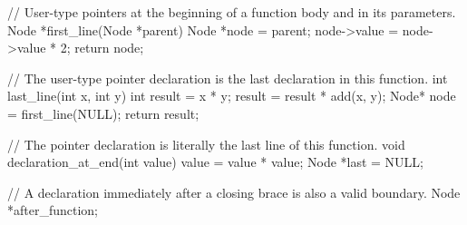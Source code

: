 \documentclass{article}
\begin{document}
\begin{Piton}[language=C,splittable-on-empty-lines]
// User-type pointers at the beginning of a function body and in its parameters.
Node *first_line(Node *parent) {
  Node *node = parent;
  node->value = node->value * 2;
  return node;
}

// The user-type pointer declaration is the last declaration in this function.
int last_line(int x, int y) {
  int result = x * y;
  result = result * add(x, y);
  Node* node = first_line(NULL);
  return result;
}

// The pointer declaration is literally the last line of this function.
void declaration_at_end(int value) {
  value = value * value;
  Node *last = NULL;
}

// A declaration immediately after a closing brace is also a valid boundary.
Node *after_function;
\end{Piton}
\end{document}
